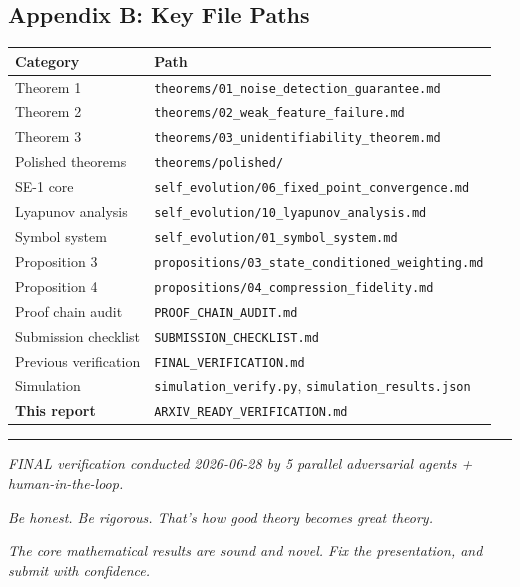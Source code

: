 \documentclass[
  12pt,
]{ctexart}
\begin{document}
\subsection{Appendix B: Key File Paths}\label{appendix-b-key-file-paths}

\begin{longtable}[]{@{}ll@{}}
\toprule\noalign{}
Category & Path \\
\midrule\noalign{}
\endhead
\bottomrule\noalign{}
\endlastfoot
Theorem 1 & \texttt{theorems/01\_noise\_detection\_guarantee.md} \\
Theorem 2 & \texttt{theorems/02\_weak\_feature\_failure.md} \\
Theorem 3 & \texttt{theorems/03\_unidentifiability\_theorem.md} \\
Polished theorems & \texttt{theorems/polished/} \\
SE-1 core & \texttt{self\_evolution/06\_fixed\_point\_convergence.md} \\
Lyapunov analysis &
\texttt{self\_evolution/10\_lyapunov\_analysis.md} \\
Symbol system & \texttt{self\_evolution/01\_symbol\_system.md} \\
Proposition 3 &
\texttt{propositions/03\_state\_conditioned\_weighting.md} \\
Proposition 4 & \texttt{propositions/04\_compression\_fidelity.md} \\
Proof chain audit & \texttt{PROOF\_CHAIN\_AUDIT.md} \\
Submission checklist & \texttt{SUBMISSION\_CHECKLIST.md} \\
Previous verification & \texttt{FINAL\_VERIFICATION.md} \\
Simulation & \texttt{simulation\_verify.py},
\texttt{simulation\_results.json} \\
\textbf{This report} & \texttt{ARXIV\_READY\_VERIFICATION.md} \\
\end{longtable}

\begin{center}\rule{0.5\linewidth}{0.5pt}\end{center}

\emph{FINAL verification conducted 2026-06-28 by 5 parallel adversarial
agents + human-in-the-loop.}

\emph{Be honest. Be rigorous. That's how good theory becomes great
theory.}

\emph{The core mathematical results are sound and novel. Fix the
presentation, and submit with confidence.}
\end{document}
